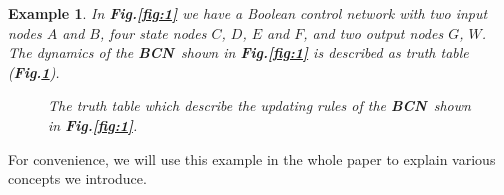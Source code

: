 \documentclass[letterpaper, 10 pt, conference]{ieeeconf}  %
\newtheorem{example}{Example}
\def \BCN {{\bf BCN}}
\begin{document}
\begin{example}
	In {\bf Fig.\ref{fig:1}} we have a Boolean control network with two input nodes $A$ and $B$, four state nodes $C$, $D$, $E$ and $F$, and two output nodes $G$, $W$. The dynamics of the \BCN\ shown in {\bf Fig.\ref{fig:1}} is described as truth table ({\bf Fig.\ref{fig:2}}).
  \begin{figure}[thpb]
      \centering
      
      \caption{The truth table which describe the updating rules of the \BCN\ shown in {\bf Fig.\ref{fig:1}}.}
      \label{fig:2}
   \end{figure}
\end{example}   
For convenience, we will use this example in the whole paper to explain various concepts we introduce.


\end{document}
